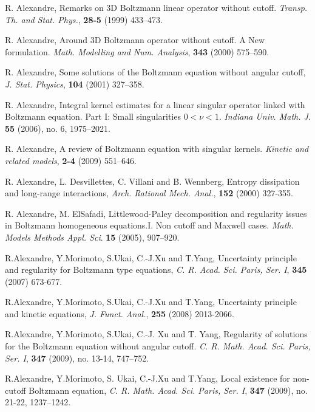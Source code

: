 \documentclass{amsart}[12pt, article]
\begin{document}
\begin{thebibliography}{99}
 R. Alexandre, Remarks on 3D Boltzmann linear operator without cutoff. {\it Transp. Th. and Stat. Phys.}, {\bf 28-5} (1999) 433--473.

 R. Alexandre, Around 3D Boltzmann operator without cutoff. A New
formulation. {\it Math. Modelling and Num. Analysis}, {\bf 343} (2000) 575--590.

R. Alexandre,  Some solutions of the Boltzmann equation without
angular cutoff, {\it J. Stat. Physics}, {\bf 104} (2001) 327--358.

R. Alexandre, Integral kernel estimates
for a linear singular operator linked with Boltzmann equation. Part
I: Small singularities $0 < \nu < 1$. {\it Indiana Univ. Math. J}. \textbf{55} (2006), no. 6, 1975--2021.

 R. Alexandre, A review of Boltzmann equation with singular kernels. {\it Kinetic and related models}, {\bf
2-4} (2009) 551--646.

 R. Alexandre, L. Desvillettes, C. Villani and  B. Wennberg,
Entropy  dissipation and long-range interactions, {\it Arch.
Rational Mech. Anal.}, {\bf 152} (2000) 327-355.

 R. Alexandre, M. ElSafadi, Littlewood-Paley decomposition and regularity issues
in Boltzmann homogeneous equations.I.
Non cutoff and Maxwell cases. {\it Math. Models Methods Appl. Sci}. \textbf{15} (2005), 907--920.

 R.Alexandre, Y.Morimoto, S.Ukai, C.-J.Xu and T.Yang,
Uncertainty principle and regularity for Boltzmann type equations,
{\it C. R. Acad. Sci. Paris, Ser. I}, {\bf 345} (2007) 673-677.

 R.Alexandre, Y.Morimoto, S.Ukai, C.-J.Xu and T.Yang,
Uncertainty principle and kinetic equations, {\it J. Funct. Anal.},
{\bf 255} (2008) 2013-2066.

 R.Alexandre, Y.Morimoto, S.Ukai, C.-J. Xu and T. Yang,
 Regularity of solutions for the Boltzmann equation without angular cutoff.
 {\it C. R. Math. Acad. Sci. Paris, Ser. I}, {\bf 347} (2009), no. 13-14, 747--752.

 R.Alexandre, Y.Morimoto, S. Ukai, C.-J.Xu and T.Yang,
Local existence for non-cutoff Boltzmann equation, {\it C. R. Math. Acad. Sci. Paris, Ser. I}, {\bf 347} (2009), no. 21-22, 1237--1242.


\end{thebibliography}
\end{document}
